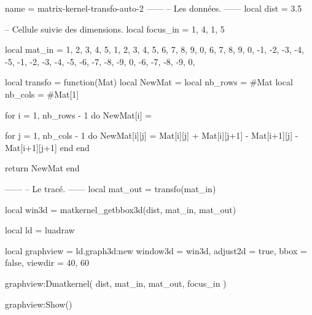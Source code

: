 \documentclass[border = 3pt]{standalone}
\begin{document}
\begin{luadraw*}{name = matrix-kernel-transfo-auto-2}
------
-- Les données.
------
local dist = 3.5

-- Cellule suivie des dimensions.
local focus_in = { {1, 4}, {1, 5} }

local mat_in = {
  { 1,  2,  3,  4,  5,  1,  2,  3,  4,  5},
  { 6,  7,  8,  9,  0,  6,  7,  8,  9,  0},
  {-1, -2, -3, -4, -5, -1, -2, -3, -4, -5},
  {-6, -7, -8, -9,  0, -6, -7, -8, -9,  0},
}

local transfo = function(Mat)
  local NewMat  = {}
  local nb_rows = #Mat
  local nb_cols = #Mat[1]

  for i = 1, nb_rows - 1 do
    NewMat[i] = {}

    for j = 1, nb_cols - 1 do
      NewMat[i][j] = Mat[i][j] + Mat[i][j+1] - Mat[i+1][j] - Mat[i+1][j+1]
    end
  end

  return NewMat
end

------
-- Le tracé.
------
local mat_out = transfo(mat_in)

local win3d = matkernel_getbbox3d(dist, mat_in, mat_out)

local ld = luadraw

local graphview = ld.graph3d:new{
  window3d = win3d,
  adjust2d = true,
  bbox     = false,
  viewdir  = {40, 60}
}

graphview:Dmatkernel(
  dist,
  mat_in, mat_out,
  focus_in
)

graphview:Show()
\end{luadraw*}
\end{document}
